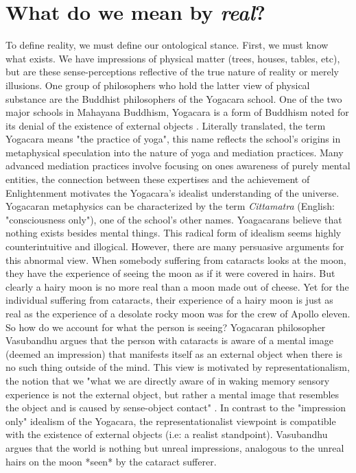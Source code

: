 \section{What do we mean by \textit{real}?}
To define reality, we must define our ontological stance. First, we must know what exists. We have impressions of physical matter (trees, houses, tables, etc), but are these sense-perceptions reflective of the true nature of reality or merely illusions. One group of philosophers who hold the latter view of physical substance are the Buddhist philosophers of the Yogacara school.  
\newline 
One of the two major schools in Mahayana Buddhism, Yogacara is a form of Buddhism noted for its denial of the existence of external objects \cite{siderits2007buddhism} . Literally translated, the term Yogacara means "the practice of yoga", this name reflects the school's origins in metaphysical speculation into the nature of yoga and mediation practices. Many advanced mediation practices involve focusing on ones awareness of purely mental entities, the connection between these expertises and the achievement of Enlightenment motivates the Yogacara's idealist understanding of the universe. Yogacaran metaphysics can be characterized by the term \textit{Cittamatra} (English: "consciousness only"), one of the school's other names. Yoagacarans believe that nothing exists besides mental things. This radical form of idealism seems highly counterintuitive and illogical. However, there are many persuasive arguments for this abnormal view. When somebody suffering from cataracts looks at the moon, they have the experience of seeing the moon as if it were covered in hairs. But clearly a hairy moon is no more real than a moon made out of cheese. Yet for the individual suffering from cataracts, their experience of a hairy moon is just as real as the experience of a desolate rocky moon was for the crew of Apollo eleven. So how do we account for what the person is seeing? Yogacaran philosopher Vasubandhu argues that the person with cataracts is aware of a mental image (deemed an impression) that manifests itself as an external object when there is no such thing outside of the mind. This view is motivated by representationalism, the notion that we "what we are directly aware of in waking memory sensory experience is not the external object, but rather a mental image that resembles the object and is caused by sense-object contact" \cite{siderits2007buddhism}.  \newline In contrast to the "impression only" idealism of the Yogacara, the representationalist viewpoint is compatible with the existence of external objects (i.e: a realist standpoint). Vasubandhu argues that the world is nothing but unreal impressions, analogous to the unreal hairs on the moon *seen* by the cataract sufferer.

